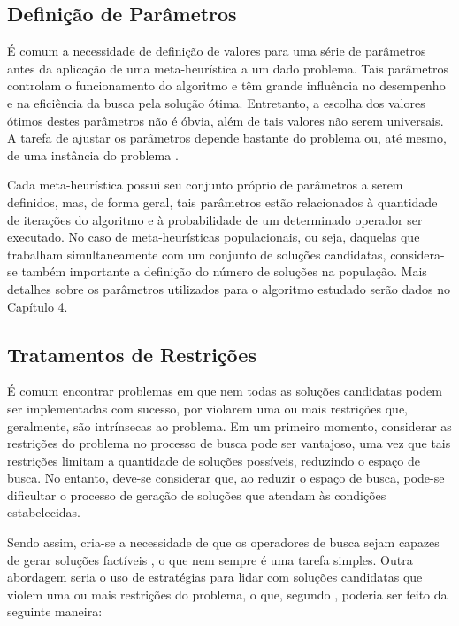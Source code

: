 \subsection{Definição de Parâmetros}
\label{subsec:subc213}
É comum a necessidade de definição de valores para uma série de parâmetros antes da aplicação de uma meta-heurística a um dado problema. Tais parâmetros controlam o funcionamento do algoritmo e têm grande influência no desempenho e na eficiência da busca pela solução ótima. Entretanto, a escolha dos valores ótimos destes parâmetros não é óbvia, além de tais valores não serem universais. A tarefa de ajustar os parâmetros depende bastante do problema ou, até mesmo, de uma instância do problema \cite{Talbi2009}.

Cada meta-heurística possui seu conjunto próprio de parâmetros a serem definidos, mas, de forma geral, tais parâmetros estão relacionados à quantidade de iterações do algoritmo e à probabilidade de um determinado operador ser executado. No caso de meta-heurísticas populacionais, ou seja, daquelas que trabalham simultaneamente com um conjunto de soluções candidatas, considera-se também importante a definição do número de soluções na população. Mais detalhes sobre os parâmetros utilizados para o algoritmo estudado serão dados no Capítulo 4.

\subsection{Tratamentos de Restrições}
\label{subsec:subc214}
É comum encontrar problemas em que nem todas as soluções candidatas podem ser implementadas com sucesso, por violarem uma ou mais restrições que, geralmente, são intrínsecas ao problema. Em um primeiro momento, considerar as restrições do problema no processo de busca pode ser vantajoso, uma vez que tais restrições limitam a quantidade de soluções possíveis, reduzindo o espaço de busca. No entanto, deve-se considerar que, ao reduzir o espaço de busca, pode-se dificultar o processo de geração de soluções que atendam às condições estabelecidas.

Sendo assim, cria-se a necessidade de que os operadores de busca sejam capazes de gerar soluções factíveis \cite{Michalewicz2004}, o que nem sempre é uma tarefa simples. Outra abordagem seria o uso de estratégias para lidar com soluções candidatas que violem uma ou mais restrições do problema, o que, segundo \cite{Talbi2009}, poderia ser feito da seguinte maneira:

